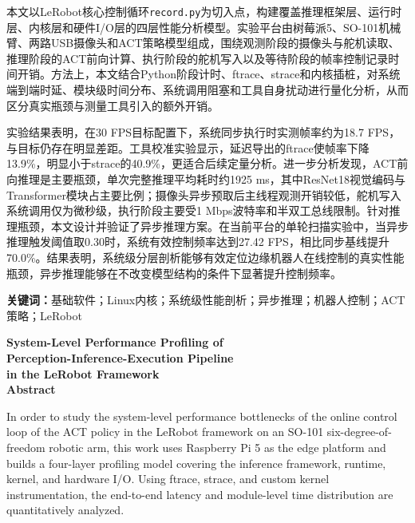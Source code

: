 \documentclass[12pt, a4paper, fontset=macnew]{ctexart}
\begin{document}
本文以LeRobot核心控制循环\texttt{record.py}为切入点，构建覆盖推理框架层、运行时层、内核层和硬件I/O层的四层性能分析模型。实验平台由树莓派5、SO-101机械臂、两路USB摄像头和ACT策略模型组成，围绕观测阶段的摄像头与舵机读取、推理阶段的ACT前向计算、执行阶段的舵机写入以及等待阶段的帧率控制记录时间开销。方法上，本文结合Python阶段计时、ftrace、strace和内核插桩，对系统端到端时延、模块级时间分布、系统调用阻塞和工具自身扰动进行量化分析，从而区分真实瓶颈与测量工具引入的额外开销。

实验结果表明，在30 FPS目标配置下，系统同步执行时实测帧率约为18.7 FPS，与目标仍存在明显差距。工具校准实验显示，延迟导出的ftrace使帧率下降13.9\%，明显小于strace的40.9\%，更适合后续定量分析。进一步分析发现，ACT前向推理是主要瓶颈，单次完整推理平均耗时约1925 ms，其中ResNet18视觉编码与Transformer模块占主要比例；摄像头异步预取后主线程观测开销较低，舵机写入系统调用仅为微秒级，执行阶段主要受1 Mbps波特率和半双工总线限制。针对推理瓶颈，本文设计并验证了异步推理方案。在当前平台的单轮扫描实验中，当异步推理触发阈值取0.30时，系统有效控制频率达到27.42 FPS，相比同步基线提升70.0\%。结果表明，系统级分层剖析能够有效定位边缘机器人在线控制的真实性能瓶颈，异步推理能够在不改变模型结构的条件下显著提升控制频率。

\vspace{1.5em}
{\heiti\bfseries 关键词：}{\songti 基础软件；Linux内核；系统级性能剖析；异步推理；机器人控制；ACT策略；LeRobot}

\clearpage

\begin{center}
  {\rmfamily\bfseries
    System-Level Performance Profiling of\\[4pt]
    Perception-Inference-Execution Pipeline\\[4pt]
    in the LeRobot Framework}\\[1.2em]
  {\rmfamily\bfseries Abstract}
\end{center}

\vspace{1em}
\rmfamily
In order to study the system-level performance bottlenecks of the online control loop of the ACT policy in the LeRobot framework on an SO-101 six-degree-of-freedom robotic arm, this work uses Raspberry Pi 5 as the edge platform and builds a four-layer profiling model covering the inference framework, runtime, kernel, and hardware I/O. Using ftrace, strace, and custom kernel instrumentation, the end-to-end latency and module-level time distribution are quantitatively analyzed.
\end{document}
